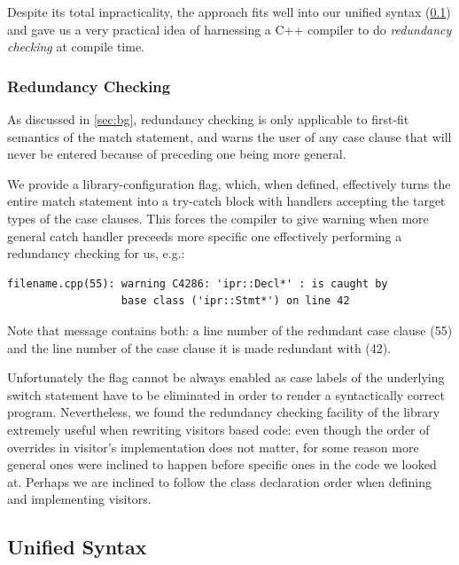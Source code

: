 \documentclass[preprint]{sigplanconf}
\begin{document}
Despite its total inpracticality, the approach fits well into our unified syntax 
(\textsection\ref{sec:unisyn}) and gave us a very practical idea of harnessing a
C++ compiler to do \emph{redundancy checking} at compile time.

\subsubsection{Redundancy Checking}
\label{sec:redun}

As discussed in \textsection\ref{sec:bg}, redundancy checking is only applicable 
to first-fit semantics of the match statement, and warns the user of any 
case clause that will never be entered because of preceding one being more 
general.

We provide a library-configuration flag, which, when defined, effectively turns 
the entire match statement into a try-catch block with handlers accepting the 
target types of the case clauses. This forces the compiler to give warning when 
more general catch handler preceeds more specific one effectively performing a 
redundancy checking for us, e.g.:

\begin{lstlisting}
filename.cpp(55): warning C4286: 'ipr::Decl*' : is caught by 
                  base class ('ipr::Stmt*') on line 42
\end{lstlisting}

\noindent
Note that message contains both: a line number of the redundant case clause (55) 
and the line number of the case clause it is made redundant with (42).

Unfortunately the flag cannot be always enabled as case labels of the underlying 
switch statement have to be eliminated in order to render a syntactically 
correct program. Nevertheless, we found the redundancy checking facility of the 
library extremely useful when rewriting visitors based code: even though the 
order of overrides in visitor's implementation does not matter, for some reason 
more general ones were inclined to happen before specific ones in the code we 
looked at. Perhaps we are inclined to follow the class declaration order when 
defining and implementing visitors.

\subsection{Unified Syntax}
\label{sec:unisyn}
\end{document}
